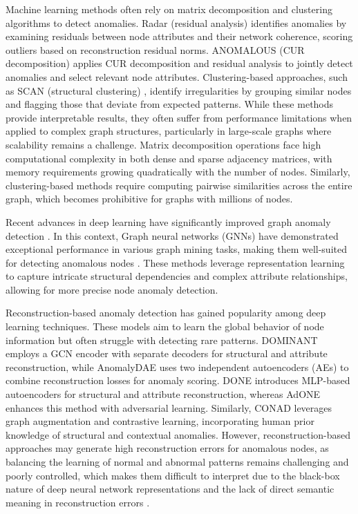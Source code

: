 \documentclass[preprint,12pt]{elsarticle}
\theoremstyle{plain}
\theoremstyle{definition}
\theoremstyle{remark}
\begin{document}
Machine learning methods often rely on matrix decomposition and clustering algorithms to detect anomalies. Radar (residual analysis) \cite{li2017radar} identifies anomalies by examining residuals between node attributes and their network coherence, scoring outliers based on reconstruction residual norms. ANOMALOUS (CUR decomposition) \cite{peng2018anomalous} applies CUR decomposition \cite{mahoney2009cur} and residual analysis to jointly detect anomalies and select relevant node attributes. Clustering-based approaches, such as SCAN (structural clustering) \cite{xu2007scan}, identify irregularities by grouping similar nodes and flagging those that deviate from expected patterns. While these methods provide interpretable results, they often suffer from performance limitations when applied to complex graph structures, particularly in large-scale graphs where scalability remains a challenge. Matrix decomposition operations face high computational complexity in both dense and sparse adjacency matrices, with memory requirements growing quadratically with the number of nodes. Similarly, clustering-based methods require computing pairwise similarities across the entire graph, which becomes prohibitive for graphs with millions of nodes.

Recent advances in deep learning have significantly improved graph anomaly detection \cite{zhang2020deep,wu2020comprehensive,Ma_2023,wu2022graph}. In this context, Graph neural networks (GNNs) have demonstrated exceptional performance in various graph mining tasks, making them well-suited for detecting anomalous nodes \cite{NEURIPS2022-acc1ec4a}. These methods leverage representation learning to capture intricate structural dependencies and complex attribute relationships, allowing for more precise node anomaly detection.

Reconstruction-based anomaly detection has gained popularity among deep learning techniques. These models aim to learn the global behavior of node information but often struggle with detecting rare patterns. DOMINANT \cite{ding2019deep} employs a GCN encoder with separate decoders for structural and attribute reconstruction, while AnomalyDAE \cite{fan2020anomalydae} uses two independent autoencoders (AEs) to combine reconstruction losses for anomaly scoring. DONE \cite{bandyopadhyay2020outlier} introduces MLP-based autoencoders for structural and attribute reconstruction, whereas AdONE \cite{bandyopadhyay2020outlier} enhances this method with adversarial learning. Similarly, CONAD \cite{xu2022contrastive} leverages graph augmentation and contrastive learning, incorporating human prior knowledge of structural and contextual anomalies. However, reconstruction-based approaches may generate high reconstruction errors for anomalous nodes, as balancing the learning of normal and abnormal patterns remains challenging and poorly controlled, which makes them difficult to interpret due to the black-box nature of deep neural network representations and the lack of direct semantic meaning in reconstruction errors \cite{Ruff_2021}.
\end{document}
